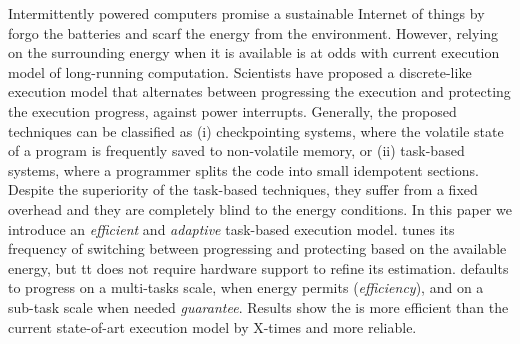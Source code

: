 Intermittently powered computers promise a sustainable Internet of things by forgo the batteries and scarf the energy from the environment. 
However, relying on the surrounding energy when it is available is at odds with current execution model of long-running computation. 
Scientists have proposed a discrete-like execution model that alternates between progressing the execution and protecting the execution progress, against power interrupts.
Generally, the proposed techniques can be classified as (i) checkpointing systems, where the volatile state of a program is frequently saved to non-volatile memory, or (ii) task-based systems, where a programmer splits the code into small idempotent sections. Despite the superiority of the task-based techniques, they suffer from a fixed overhead and they are completely blind to the energy conditions.   
In this paper we introduce \sys an \emph{efficient} and \emph{adaptive} task-based execution model.
\sys tunes its frequency of switching between progressing and protecting based on the available energy, but 
tt does not require hardware support to refine its estimation. 
\sys defaults to progress on a multi-tasks scale, when energy permits (\emph{efficiency}), and on a sub-task scale when needed {\emph{guarantee}}. 
Results show the \sys is more efficient than the current state-of-art execution model by X-times and more reliable. 

